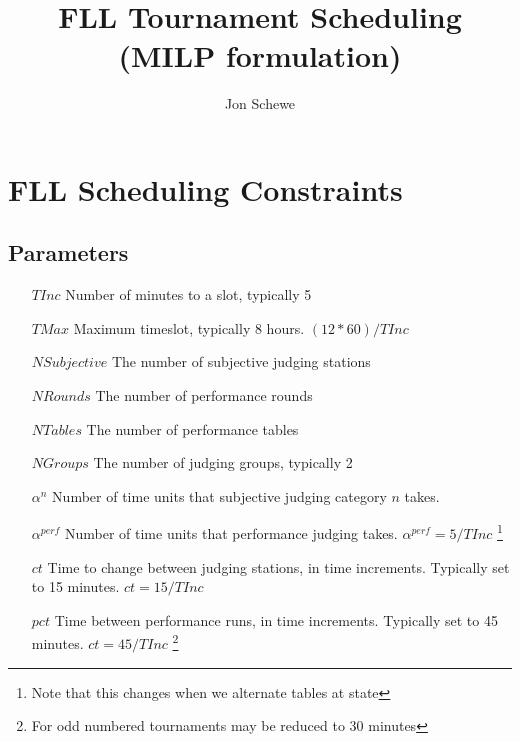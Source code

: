 \documentclass[letterpaper,11pt]{report}
\title{FLL Tournament Scheduling (MILP formulation)}
\author{Jon Schewe}
\newcommand{\doccomment}[3]%
{\marginpar{\textcolor{#2}{\bf #1}}%
\footnote{{\color{#2}#3}}%
}
\newcommand{\doccomment}[3]{}
\newcommand{\jpscomment}[1]%
{\doccomment{SCHEWE}{Bittersweet}{#1}}
\begin{document}
\maketitle

\chapter{FLL Scheduling Constraints}

\section{Parameters}
\begin{itemize}

\item[$TInc$] Number of minutes to a slot, typically 5
\item[$TMax$] Maximum timeslot, typically 8 hours. $(12 * 60)/TInc$
\item[$NSubjective$] The number of subjective judging stations
\item[$NRounds$] The number of performance rounds
\item[$NTables$] The number of performance tables
\item[$NGroups$] The number of judging groups, typically 2

\item[$\alpha^{n}$] Number of time units that subjective judging
  category $n$ takes.

\item[$\alpha^{perf}$] Number of time units that performance judging
  takes. $\alpha^{perf} = 5 / TInc$ \jpscomment{Note that this
changes when we alternate tables at state}

\item[$ct$] Time to change between judging stations, in time increments. Typically set to 15
  minutes. $ct = 15/TInc$
\item[$pct$] Time between performance runs, in time increments. Typically set to 45
  minutes. $ct = 45/TInc$ \jpscomment{For odd numbered tournaments may be reduced to 30
    minutes}

\end{itemize}
\end{document}
